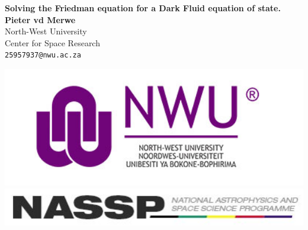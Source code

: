 \documentclass[a0,portrait]{a0poster}
\begin{document}


\begin{minipage}[b]{0.75\linewidth}
\veryHuge \color{NavyBlue} \textbf{Solving the Friedman equation for a Dark Fluid equation of state.} \color{Black}\\ %
\huge \textbf{Pieter vd Merwe }\\[0.5cm] %
\huge North-West University \\ Center for Space Research\\[0.4cm] %
\Large \texttt{25957937@nwu.ac.za}\\
\end{minipage}
%
\begin{minipage}[b]{0.25\linewidth}
\includegraphics[width=20cm]{nwu-logo.jpg}\\
\includegraphics[width=20cm]{NASSP_Logo.jpg}\\
\end{minipage}

\vspace{1cm} %
\end{document}
